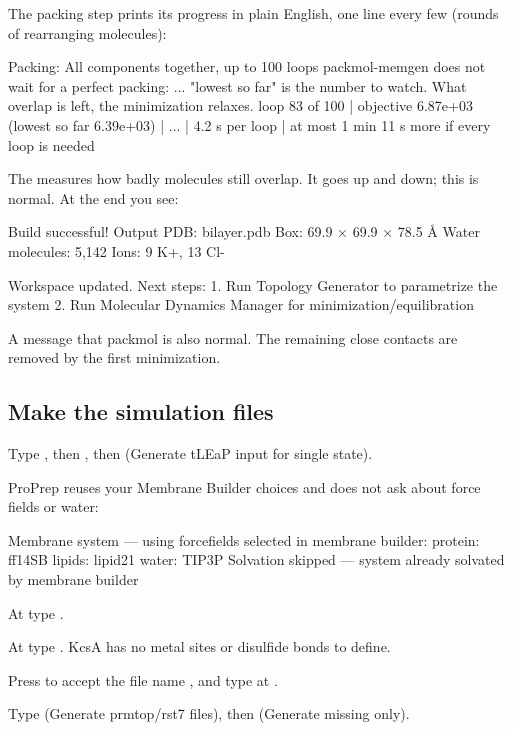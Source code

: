The packing step prints its progress in plain English, one line every few
 (rounds of rearranging molecules):

\begin{screen}
  Packing: All components together, up to 100 loops
    packmol-memgen does not wait for a perfect packing: ... "lowest so far"
    is the number to watch. What overlap is left, the minimization relaxes.
    loop 83 of 100 | objective 6.87e+03 (lowest so far 6.39e+03) | ...
    | 4.2 s per loop | at most 1 min 11 s more if every loop is needed
\end{screen}

The  measures how badly molecules still overlap. It goes up
and down; this is normal. At the end you see:

\begin{screen}
Build successful!
  Output PDB: bilayer.pdb
  Box: 69.9 × 69.9 × 78.5 Å
  Water molecules: 5,142
  Ions: 9 K+, 13 Cl-

Workspace updated. Next steps:
  1. Run Topology Generator to parametrize the system
  2. Run Molecular Dynamics Manager for minimization/equilibration
\end{screen}

A message that packmol  is also normal. The remaining close contacts are removed by
the first minimization.

\subsection{Make the simulation files}

\begin{steps}
  \item Type , then , then  (\textsf{Generate tLEaP
        input for single state}).
  \item ProPrep reuses your Membrane Builder choices and does not ask about
        force fields or water:
\begin{screen}
Membrane system — using forcefields selected in membrane builder:
  protein: ff14SB
  lipids: lipid21
  water: TIP3P
Solvation skipped — system already solvated by membrane builder
\end{screen}
  \item At  type .
  \item At  type
        . KcsA has no metal sites or disulfide bonds to define.
  \item Press  to accept the file name , and
        type  at .
  \item Type  (\textsf{Generate prmtop/rst7 files}), then 
        (\textsf{Generate missing only}).
\end{steps}

